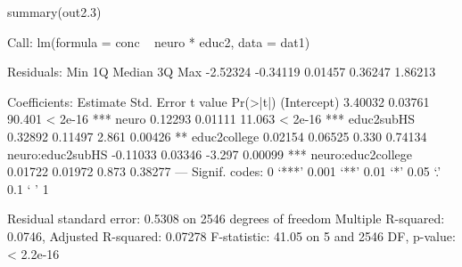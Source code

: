 \begin{Schunk}
\begin{Sinput}
 summary(out2.3)
\end{Sinput}
\begin{Soutput}
Call:
lm(formula = conc ~ neuro * educ2, data = dat1)

Residuals:
     Min       1Q   Median       3Q      Max 
-2.52324 -0.34119  0.01457  0.36247  1.86213 

Coefficients:
                   Estimate Std. Error t value Pr(>|t|)    
(Intercept)         3.40032    0.03761  90.401  < 2e-16 ***
neuro               0.12293    0.01111  11.063  < 2e-16 ***
educ2subHS          0.32892    0.11497   2.861  0.00426 ** 
educ2college        0.02154    0.06525   0.330  0.74134    
neuro:educ2subHS   -0.11033    0.03346  -3.297  0.00099 ***
neuro:educ2college  0.01722    0.01972   0.873  0.38277    
---
Signif. codes:  0 ‘***’ 0.001 ‘**’ 0.01 ‘*’ 0.05 ‘.’ 0.1 ‘ ’ 1

Residual standard error: 0.5308 on 2546 degrees of freedom
Multiple R-squared:  0.0746,	Adjusted R-squared:  0.07278 
F-statistic: 41.05 on 5 and 2546 DF,  p-value: < 2.2e-16
\end{Soutput}
\end{Schunk}
